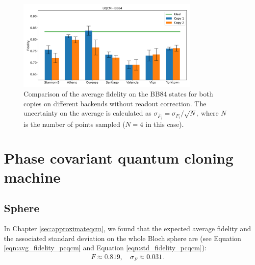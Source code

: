 \begin{figure}[H]
    \centering
            \includegraphics[width=0.8\textwidth]{Figures/UQCM/Histograms/histo_bb84_corrected.png}
        
        \caption{Comparison of the average fidelity on the BB84 states for both copies on different backends without readout correction. The uncertainty on the average is calculated as $\sigma_{\overline{F}_i}=\sigma_{F_i}/\sqrt{N}$, where $N$ is the number of points sampled ($N=4$ in this case).}\label{fig:hist_uqcm_bb84}
\end{figure}


\section{Phase covariant quantum cloning machine}
\subsection{Sphere}
In Chapter \ref{sec:approximateqcm}, we found that the expected average fidelity and the associated standard deviation on the whole Bloch sphere are (see Equation \ref{eqn:avg_fidelity_pcqcm} and Equation \ref{eqn:std_fidelity_pcqcm}):
\[
  \overline{F}\approx0.819, \quad \sigma_{F}\approx0.031.
\]

